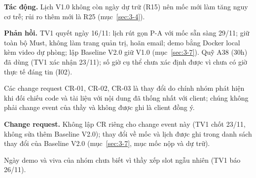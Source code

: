 \textbf{Tác động.} Lịch V1.0 không còn ngày dự trữ (R15) nên mốc mới làm tăng nguy cơ trễ; rủi ro thêm mới là R25 (mục~\ref{sec:3-4}).

\textbf{Phản hồi.} TV1 quyết ngày 16/11: lịch rút gọn P-A với mốc sẵn sàng 29/11; giữ toàn bộ Must, không làm trang quản trị, hoãn email; demo bằng Docker local kèm video dự phòng; lập Baseline V2.0 giữ V1.0 (mục~\ref{sec:3-7}). Quỹ A38 (30h) đã dùng (TV1 xác nhận 23/11); số giờ cụ thể chưa xác định được vì chưa có giờ thực tế đáng tin (I02).

Các change request CR-01, CR-02, CR-03 là thay đổi do chính nhóm phát hiện khi đối chiếu code và tài liệu với nội dung đã thống nhất với client; chúng không phải change event của thầy và không được ghi là client đồng ý.

\textbf{Change request.} Không lập CR riêng cho change event này (TV1 chốt 23/11, không sửa thêm Baseline V2.0); thay đổi về mốc và lịch được ghi trong danh sách thay đổi của Baseline V2.0 (mục~\ref{sec:3-7}, mục mốc nộp và dự trữ).

Ngày demo và viva của nhóm chưa biết vì thầy xếp slot ngẫu nhiên (TV1 báo 26/11).


